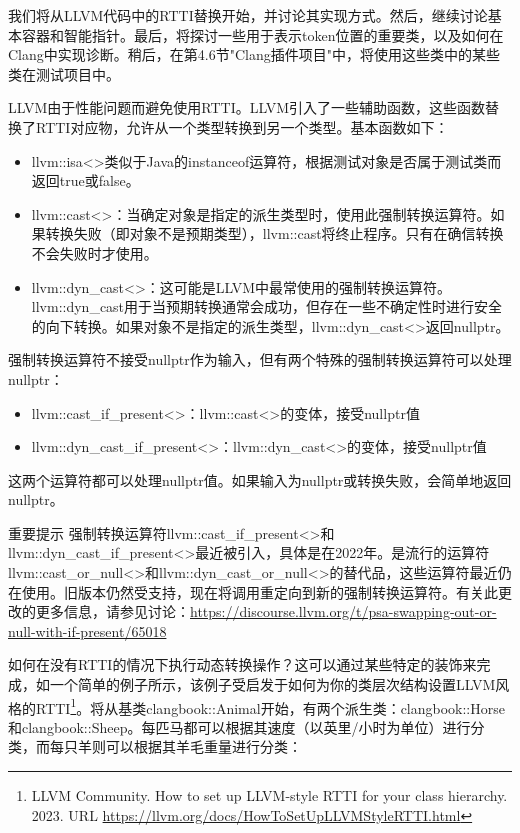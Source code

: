 我们将从LLVM代码中的RTTI替换开始，并讨论其实现方式。然后，继续讨论基本容器和智能指针。最后，将探讨一些用于表示token位置的重要类，以及如何在Clang中实现诊断。稍后，在第4.6节"Clang插件项目"中，将使用这些类中的某些类在测试项目中。


LLVM由于性能问题而避免使用RTTI。LLVM引入了一些辅助函数，这些函数替换了RTTI对应物，允许从一个类型转换到另一个类型。基本函数如下：

\begin{itemize}
\item
llvm::isa<>类似于Java的instanceof运算符，根据测试对象是否属于测试类而返回true或false。

\item
llvm::cast<>：当确定对象是指定的派生类型时，使用此强制转换运算符。如果转换失败（即对象不是预期类型），llvm::cast将终止程序。只有在确信转换不会失败时才使用。

\item
llvm::dyn\_cast<>：这可能是LLVM中最常使用的强制转换运算符。llvm::dyn\_cast用于当预期转换通常会成功，但存在一些不确定性时进行安全的向下转换。如果对象不是指定的派生类型，llvm::dyn\_cast<>返回nullptr。
\end{itemize}

强制转换运算符不接受nullptr作为输入，但有两个特殊的强制转换运算符可以处理nullptr：

\begin{itemize}
\item
llvm::cast\_if\_present<>：llvm::cast<>的变体，接受nullptr值

\item
llvm::dyn\_cast\_if\_present<>：llvm::dyn\_cast<>的变体，接受nullptr值
\end{itemize}

这两个运算符都可以处理nullptr值。如果输入为nullptr或转换失败，会简单地返回nullptr。

\begin{myNotic}{重要提示}
强制转换运算符llvm::cast\_if\_present<>和llvm::dyn\_cast\_if\_present<>最近被引入，具体是在2022年。是流行的运算符llvm::cast\_or\_null<>和llvm::dyn\_cast\_or\_null<>的替代品，这些运算符最近仍在使用。旧版本仍然受支持，现在将调用重定向到新的强制转换运算符。有关此更改的更多信息，请参见讨论：\url{https://discourse.llvm.org/t/psa-swapping-out-or-null-with-if-present/65018}
\end{myNotic}

如何在没有RTTI的情况下执行动态转换操作？这可以通过某些特定的装饰来完成，如一个简单的例子所示，该例子受启发于如何为你的类层次结构设置LLVM风格的RTTI\footnote{LLVM Community. How to set up LLVM-style RTTI for your class hierarchy. 2023. URL \url{https://llvm.org/docs/HowToSetUpLLVMStyleRTTI.html}}。将从基类clangbook::Animal开始，有两个派生类：clangbook::Horse和clangbook::Sheep。每匹马都可以根据其速度（以英里/小时为单位）进行分类，而每只羊则可以根据其羊毛重量进行分类：

